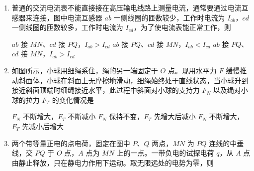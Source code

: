 \documentclass[\gkver]{gaokaozhenti}
\begin{document}
\begin{enumerate}

{$Q_{1}>Q_{2}$，$q_{1}>q_{2}$}
{$Q_{1}=Q_{2}$，$q_{1}=q_{2}$}
{$Q_{1}=Q_{2}$，$q_{1}>q_{2}$}


\item
普通的交流电流表不能直接接在高压输电线路上测量电流，通常要通过电流互感器来连接，图中电流互感器 $ab$ 一侧线圈的匝数较少，工作时电流为 $I_{ab}$，$cd$ 一侧线圈的匝数较多，工作时电流为 $I_{cd}$，为了使电流表能正常工作，则


{$ab$ 接 $MN$、$cd$ 接 $PQ$，$I_{ab}>I_{cd}$}
{$ab$ 接 $PQ$、$cd$ 接 $MN$，$I_{ab}<I_{cd}$}
{$ab$ 接 $PQ$、$cd$ 接 $MN$，$I_{ab}>I_{cd}$}


\item
如图所示，小球用细绳系住，绳的另一端固定于 $O$ 点。现用水平力 $F$ 缓慢推动斜面体，小球在斜面上无摩擦地滑动，细绳始终处于直线状态，当小球升到接近斜面顶端时细绳接近水平，此过程中斜面对小球的支持力 $F_{N}$ 以及绳对小球的拉力 $F_{T}$ 的变化情况是


{$F_{N}$ 不断增大，$F_{T}$ 不断减小}
{$F_{N}$ 保持不变，$F_{T}$ 先增大后减小}
{$F_{N}$ 不断增大，$F_{T}$ 先减小后增大}


\item
两个带等量正电的点电荷，固定在图中 $P$、$Q$ 两点，$MN$ 为 $PQ$ 连线的中垂线，交 $PQ$ 于 $O$ 点，$A$ 点为 $MN$ 上的一点。一带负电的试探电荷 $q$，从 $A$ 点由静止释放，只在静电力作用下运动。取无限远处的电势为零，则


\end{enumerate}
\end{document}
